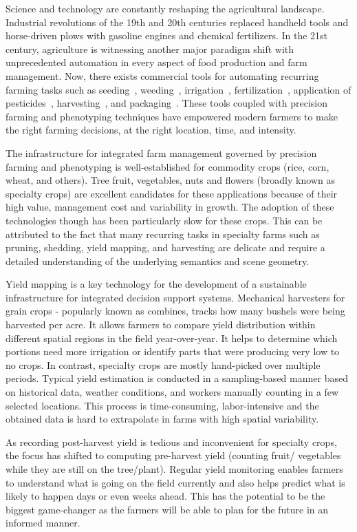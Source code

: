 Science and technology are constantly reshaping the agricultural landscape. Industrial revolutions of the 19th and 20th centuries replaced handheld tools and horse-driven plows with gasoline engines and chemical fertilizers. In the 21st century, agriculture is witnessing another major paradigm shift with unprecedented automation in every aspect of food production and farm management. Now, there exists commercial tools for automating recurring farming tasks such as seeding~\cite{tanimura_plant_2019}, weeding~\cite{weeding}, irrigation~\cite{shock2002automation}, fertilization~\cite{fertilizing}, application of pesticides~\cite{anderson2013robotic}, harvesting~\cite{gamaya_gamaya_2019}, and packaging~\cite{manetto2017improvements}. These tools coupled with precision farming and phenotyping techniques have empowered modern farmers to make the right farming decisions, at the right location, time, and intensity.

The infrastructure for integrated farm management governed by precision farming and phenotyping is well-established for commodity crops (rice, corn, wheat, and others). Tree fruit, vegetables, nuts and flowers (broadly known as specialty crops) are excellent candidates for these applications because of their high value, management cost and variability in growth. The adoption of these technologies though has been particularly slow for these crops. This can be attributed to the fact that many recurring tasks in specialty farms such as pruning, shedding, yield mapping, and harvesting are delicate and require a detailed understanding of the underlying semantics and scene geometry. 

Yield mapping is a key technology for the development of a sustainable infrastructure for integrated decision support systems. Mechanical harvesters for grain crops - popularly known as combines, tracks how many bushels were being harvested per acre. It allows farmers to compare yield distribution within different spatial regions in the field year-over-year. It helps to determine which portions need more irrigation or identify parts that were producing very low to no crops. In contrast, specialty crops are mostly hand-picked over multiple periods. Typical yield estimation is conducted in a sampling-based manner based on historical data, weather conditions, and workers manually counting in a few selected locations. This process is time-consuming, labor-intensive and the obtained data is hard to extrapolate in farms with high spatial variability. 


As recording post-harvest yield is tedious and inconvenient for specialty crops, the focus has shifted to computing pre-harvest yield (counting fruit/ vegetables while they are still on the tree/plant). Regular yield monitoring enables farmers to understand what is going on the field currently and also helps predict what is likely to happen days or even weeks ahead. This has the potential to be the biggest game-changer as the farmers will be able to plan for the future in an informed manner. 

